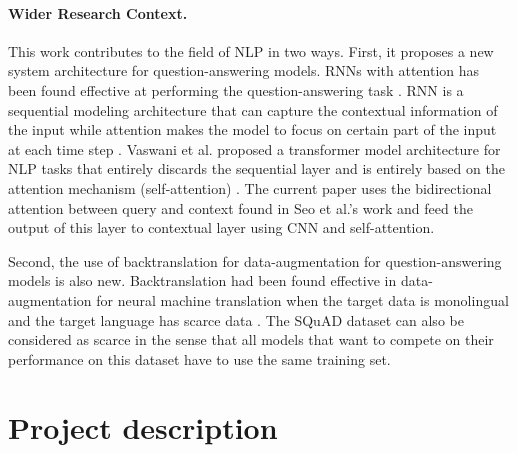 \documentclass{article}
\begin{document}
\paragraph{Wider Research Context.}
This work contributes to the field of NLP in two ways. First, it proposes a new system architecture for question-answering models. RNNs with attention has been found effective at performing the question-answering task \cite{SEO}. RNN is a sequential modeling architecture that can capture the contextual information of the input while attention makes the model to focus on certain part of the input at each time step \cite{BAH}. Vaswani et al. proposed a transformer model architecture for NLP tasks that entirely discards the sequential layer and is entirely based on the attention mechanism (self-attention) \cite{VAS}. The current paper uses the bidirectional attention between query and context found in Seo et al.'s work and feed the output of this layer to contextual layer using CNN and self-attention.

Second, the use of backtranslation for data-augmentation for question-answering models is also new. Backtranslation had been found effective in data-augmentation for neural machine translation when the target data is monolingual and the target language has scarce data \cite{SEN}. The SQuAD dataset can also be considered as scarce in the sense that all models that want to compete on their performance on this dataset have to use the same training set.  







\section{Project description}
\end{document}
